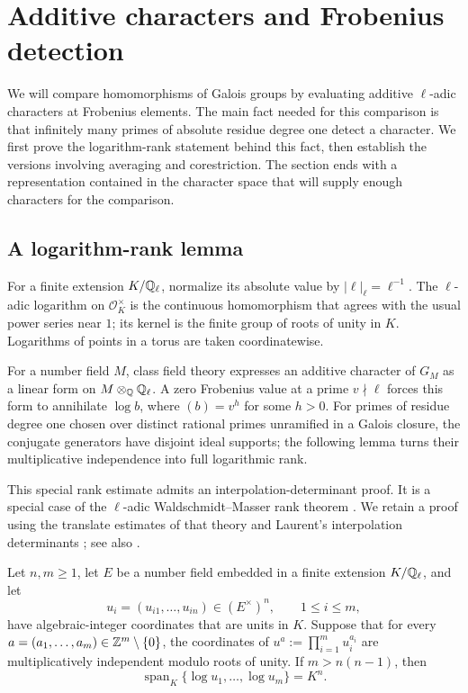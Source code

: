 \section{Additive characters and Frobenius detection}\label{sec:characters}

We will compare homomorphisms of Galois groups by evaluating additive
$\ell$-adic characters at Frobenius elements.  The main fact needed for
this comparison is that infinitely many primes of absolute residue
degree one detect a character.  We first prove the logarithm-rank
statement behind this fact, then establish the versions involving
averaging and corestriction.  The section ends with a representation
contained in the character space that will supply enough characters for
the comparison.

\subsection{A logarithm-rank lemma}

For a finite extension $K/\mathbb Q_\ell$, normalize its absolute value by
$|\ell|_\ell=\ell^{-1}$.  The $\ell$-adic logarithm on
$\mathcal O_K^\times$ is the continuous homomorphism that agrees with
the usual power series near $1$; its kernel is the finite group of
roots of unity in $K$.  Logarithms of points in a torus are taken
coordinatewise.

For a number field $M$, class field theory expresses an additive
character of $G_M$ as a linear form on $M\otimes_\mathbb Q\mathbb Q_\ell$.
A zero Frobenius value at a prime $v\nmid\ell$ forces this form to
annihilate $\log b$, where $(b)=v^h$ for some $h>0$.
For primes of residue degree one chosen over distinct rational primes
unramified in a Galois closure, the conjugate generators have disjoint
ideal supports; the following lemma turns their multiplicative
independence into full logarithmic rank.

This special rank estimate admits an
interpolation-determinant proof.  It is a special case of the
$\ell$-adic Waldschmidt--Masser rank theorem
\cite{waldschmidt1981,masser1981}.  We retain a proof using the
translate estimates of that theory and Laurent's interpolation
determinants \cite{laurent1991}; see also
\cite[Theorems~5.1 and~5.8]{dasgupta2023}.

\begin{lemma}\label{lem:log-rank}
Let $n,m\geq1$, let $E$ be a number field embedded in a finite
extension $K/\mathbb Q_\ell$, and let
\[
 u_i=(u_{i1},\ldots,u_{in})\in(E^\times)^n,
 \qquad 1\leq i\leq m,
\]
have algebraic-integer coordinates that are units in $K$.  Suppose that
for every $a=(a_1,\ldots,a_m)\in\mathbb Z^m\setminus\{0\}$, the coordinates
of $u^a:=\prod_{i=1}^m u_i^{a_i}$ are multiplicatively independent
modulo roots of unity.  If $m>n(n-1)$, then
\[
 \operatorname{span}_K\{\log u_1,\ldots,\log u_m\}=K^n.
\]
\end{lemma}

